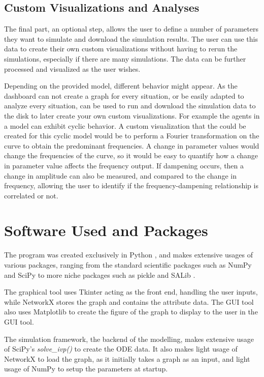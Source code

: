 \subsection{Custom Visualizations and Analyses} 
\label{sec:custom_visualizations_and_framework}
The final part, an optional step, allows the user to define a number of parameters they want to simulate and download the simulation results. 
The user can use this data to create their own custom visualizations without having to rerun the simulations, especially if there are many simulations. 
The data can be further processed and visualized as the user wishes. 

Depending on the provided model, different behavior might appear. 
As the dashboard can not create a graph for every situation, or be easily adapted to analyze every situation,  can be used to run and download the simulation data to the disk to later create your own custom visualizations. 
For example the agents in a model can exhibit cyclic behavior. 
A custom visualization that the could be created for this cyclic model would be to perform a Fourier transformation on the curve to obtain the predominant frequencies. 
A change in parameter values would change the frequencies of the curve, so it would be easy to quantify how a change in parameter value affects the frequency output. 
If dampening occurs, then a change in amplitude can also be measured, and compared to the change in frequency, allowing the user to identify if the frequency-dampening relationship is correlated or not. 

\section{Software Used and Packages}
The program was created exclusively in Python \cite{Python}, and makes extensive usages of various packages, ranging from the standard scientific packages such as NumPy \cite{NumPy} and SciPy to more niche packages such as pickle and SALib \cite{iwanagaSALib20Advancing2022, hermanSALibOpensourcePython2017}.

The graphical tool uses Tkinter acting as the front end, handling the user inputs, while NetworkX \cite{hagbergExploringNetworkStructure2008} stores the graph and contains the attribute data. 
The GUI tool also uses Matplotlib \cite{Matplotlib}to create the figure of the graph to display to the user in the GUI tool.

The simulation framework, the backend of the modelling, makes extensive usage of SciPy's \textit{solve\_ivp()} to create the ODE data. 
It also makes light usage of NetworkX to load the graph, as it initially takes a graph as an input, and light usage of NumPy to setup the parameters at startup. 


